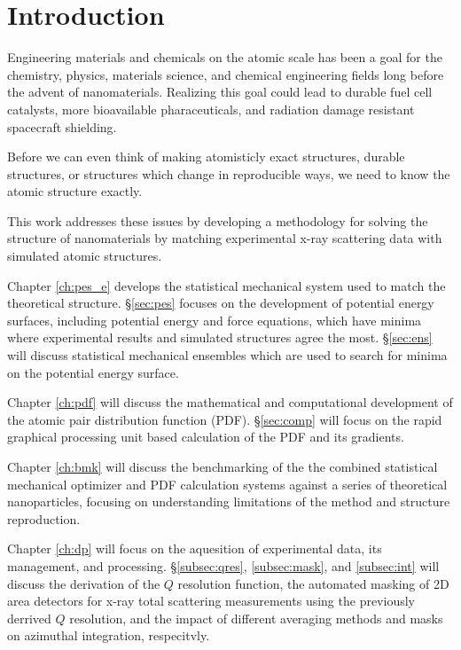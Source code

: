 \chapter*{Introduction} \label{intro}
Engineering materials and chemicals on the atomic scale has been a goal for the chemistry, physics, materials science, and chemical engineering fields long before the advent of nanomaterials.
Realizing this goal could lead to durable fuel cell catalysts, more bioavailable pharaceuticals, and radiation damage resistant spacecraft shielding.

Before we can even think of making atomisticly exact structures, durable structures, or structures which change in reproducible ways, we need to know the atomic structure exactly.


This work addresses these issues by developing a methodology for solving the structure of nanomaterials by matching experimental x-ray scattering data with simulated atomic structures.

Chapter \ref{ch:pes_e} develops the statistical mechanical system used to match the theoretical structure.
\S \ref{sec:pes} focuses on the development of potential energy surfaces, including potential energy and force equations, which have minima where experimental results and simulated structures agree the most.
\S \ref{sec:ens} will discuss statistical mechanical ensembles which are used to search for minima on the potential energy surface.

Chapter \ref{ch:pdf} will discuss the mathematical and computational development of the atomic pair distribution function (PDF).
\S \ref{sec:comp} will focus on the rapid graphical processing unit based calculation of the PDF and its gradients.

Chapter \ref{ch:bmk} will discuss the benchmarking of the the combined statistical mechanical optimizer and PDF calculation systems against a series of theoretical nanoparticles, focusing on understanding limitations of the method and structure reproduction.

Chapter \ref{ch:dp} will focus on the aquesition of experimental data, its management, and processing.
\S \ref{subsec:qres}, \ref{subsec:mask}, and \ref{subsec:int} will discuss the derivation of the $Q$ resolution function, the automated masking of 2D area detectors for x-ray total scattering measurements using the previously derrived $Q$ resolution, and the impact of different averaging methods and masks on azimuthal integration, respecitvly.